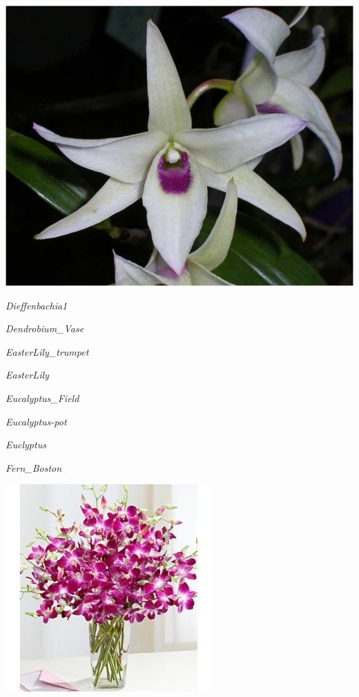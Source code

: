 \documentclass{article}
\begin{document}
\begin{center}
\includegraphics[height=0.9\textheight, angle=90]{../Dendrobium_Flower.jpg}
\end{center}
\newpage

\noindent
\vfill
\centerline{{\Large\emph{Dieffenbachia1}}}
\vfill
\newpage

\noindent
\vfill
\centerline{{\Large\emph{Dendrobium_Vase}}}
\vfill
\newpage

\noindent
\vfill
\centerline{{\Large\emph{EasterLily_trumpet}}}
\vfill
\newpage

\noindent
\vfill
\centerline{{\Large\emph{EasterLily}}}
\vfill
\newpage

\noindent
\vfill
\centerline{{\Large\emph{Eucalyptus_Field}}}
\vfill
\newpage

\noindent
\vfill
\centerline{{\Large\emph{Eucalyptus-pot}}}
\vfill
\newpage

\noindent
\vfill
\centerline{{\Large\emph{Euclyptus}}}
\vfill
\newpage

\noindent
\vfill
\centerline{{\Large\emph{Fern_Boston}}}
\vfill
\newpage

\begin{center}
\includegraphics[height=0.9\textheight, angle=90]{../Dendrobium_Vase.jpg}
\end{center}
\newpage
\end{document}
